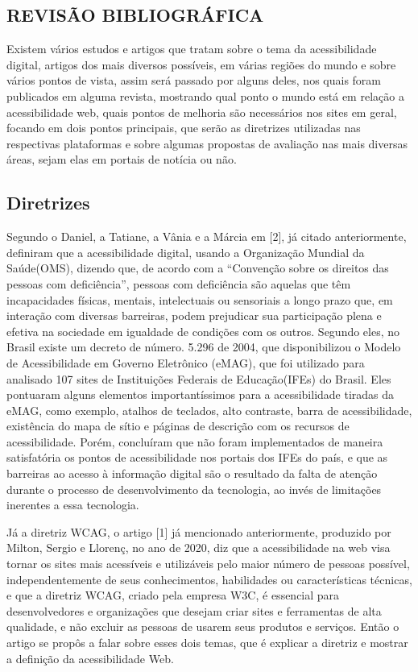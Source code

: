 \documentclass[a4paper]{article}
\begin{document}
\begin{titlepage}
\section{REVISÃO BIBLIOGRÁFICA}
Existem vários estudos e artigos que tratam sobre o tema da acessibilidade digital, artigos dos mais diversos possíveis, em várias regiões do mundo e sobre vários pontos de vista, assim será passado por alguns deles, nos quais foram publicados em alguma revista, mostrando qual ponto o mundo está em relação a acessibilidade web, quais pontos de melhoria são necessários nos sites em geral, focando em dois pontos principais, que serão as diretrizes utilizadas nas respectivas plataformas e sobre algumas propostas de avaliação nas mais diversas áreas, sejam elas em portais de notícia ou não.

\subsection{Diretrizes}
Segundo o Daniel, a Tatiane, a Vânia e a Márcia em [2], já citado anteriormente, definiram que a acessibilidade digital, usando a Organização Mundial da Saúde(OMS), dizendo que, de acordo com a “Convenção sobre os direitos das pessoas com deficiência”, pessoas com deficiência são aquelas que têm incapacidades físicas, mentais, intelectuais ou sensoriais a longo prazo que, em interação com diversas barreiras, podem prejudicar sua participação plena e efetiva na sociedade em igualdade de condições com os outros. Segundo eles, no Brasil existe um decreto de número. 5.296 de 2004, que disponibilizou o Modelo de Acessibilidade em Governo Eletrônico (eMAG), que foi utilizado para analisado 107 sites de Instituições Federais de Educação(IFEs) do Brasil. Eles pontuaram alguns elementos importantíssimos para a acessibilidade tiradas da eMAG, como exemplo, atalhos de teclados, alto contraste, barra de acessibilidade, existência do mapa de sítio e páginas de descrição com os recursos de acessibilidade. Porém, concluíram que não foram implementados de maneira satisfatória os pontos de acessibilidade nos portais dos IFEs do país, e que as barreiras ao acesso à informação digital são o resultado da falta de atenção durante o processo de desenvolvimento da tecnologia, ao invés de limitações inerentes a essa tecnologia.

Já a diretriz WCAG, o artigo [1] já mencionado anteriormente, produzido por Milton, Sergio e Llorenç, no ano de 2020, diz que a acessibilidade na web visa tornar os sites mais acessíveis e utilizáveis pelo maior número de pessoas possível, independentemente de seus conhecimentos, habilidades ou características técnicas, e que a diretriz WCAG, criado pela empresa W3C, é essencial para desenvolvedores e organizações que desejam criar sites e ferramentas de alta qualidade, e não excluir as pessoas de usarem seus produtos e serviços. Então o artigo se propôs a falar sobre esses dois temas, que é explicar a diretriz e mostrar a definição da acessibilidade Web.


\end{titlepage}
\end{document}
